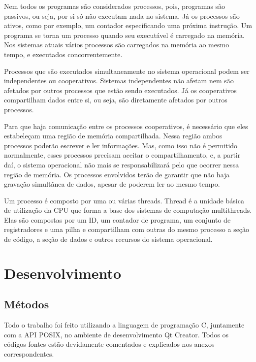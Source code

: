 \documentclass[
	article,			%
	11pt,				%
	oneside,			%
	a4paper,			%
	english,			%
	brazil,				%
	sumario=tradicional
	]{abntex2}
\begin{document}
Nem todos os programas são considerados processos, pois, programas são passivos, ou seja, por si só não executam nada no sistema. Já os processos são ativos, como por exemplo, um contador especificando uma próxima instrução. Um programa se torna um processo quando seu executável é carregado na memória. Nos sistemas atuais vários processos são carregados na memória ao mesmo tempo, e executados concorrentemente.

Processos que são executados simultaneamente no sistema operacional podem ser independentes ou cooperativos. Sistemas independentes não afetam nem são afetados por outros processos que estão sendo executados. Já os cooperativos compartilham dados entre si, ou seja, são diretamente afetados por outros processos.

Para que haja comunicação entre os processos cooperativos, é necessário que eles estabeleçam uma região de memória compartilhada. Nessa região ambos processos poderão escrever e ler informações. Mas, como isso não é permitido normalmente, esses processos precisam aceitar o compartilhamento, e, a partir daí, o sistema operacional não mais se responsabilizará pelo que ocorrer nessa região de memória. Os processos envolvidos terão de garantir que não haja gravação simultânea de dados, apesar de poderem ler ao mesmo tempo.

Um processo é composto por uma ou várias threads. Thread é a unidade básica de utilização da CPU que forma a base dos sistemas de computação multithreads. Elas são compostas por um ID, um contador de programa, um conjunto de registradores e uma pilha e compartilham com outras do mesmo processo a seção de código, a seção de dados e outros recursos do sistema operacional.
\newpage

\section*{Desenvolvimento}

\subsection*{Métodos}

Todo o trabalho foi feito utilizando a linguagem de programação C, juntamente com a API POSIX, no ambiente de desenvolvimento Qt Creator. Todos os códigos fontes estão devidamente comentados e explicados nos anexos correspondentes.
\end{document}
